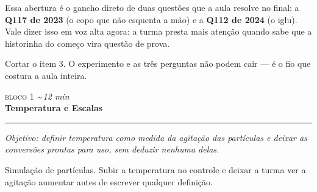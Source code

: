 \documentclass[11pt,a4paper]{article}
\newcommand{\bloco}[3]{%
  \needspace{7\baselineskip}
  \vspace{1.8em}
  {\scshape\color{vinho}bloco #1}\hfill
    {\small\itshape\color{grafite}\textasciitilde\,#3 min}\\[0.1em]
  {\Large\bfseries #2}\\[-0.55em]
  {\color{black!30}\rule{\linewidth}{0.5pt}}
  \par\nobreak\smallskip
}
\newcommand{\objetivo}[1]{{\itshape\color{grafite}Objetivo: #1}\par\smallskip}
\begin{document}
\begin{obs}
Essa abertura \'e o gancho direto de duas quest\~oes que a aula resolve no
final: a \textbf{Q117 de 2023} (o copo que n\~ao esquenta a m\~ao) e a
\textbf{Q112 de 2024} (o iglu). Vale dizer isso em voz alta agora: a
turma presta mais aten\c{c}\~ao quando sabe que a historinha do come\c{c}o vira
quest\~ao de prova.
\end{obs}

\begin{corte}
Cortar o item 3. O experimento e as tr\^es perguntas n\~ao podem cair --- \'e
o fio que costura a aula inteira.
\end{corte}

\bloco{1}{Temperatura e Escalas}{12}

\objetivo{definir temperatura como medida da agita\c{c}\~ao das part\'iculas e
deixar as convers\~oes prontas para uso, sem deduzir nenhuma delas.}

\begin{projetor}
Simula\c{c}\~ao de part\'iculas. Subir a temperatura no controle e deixar a
turma ver a agita\c{c}\~ao aumentar antes de escrever qualquer defini\c{c}\~ao.
\end{projetor}
\end{document}
